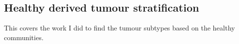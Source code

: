 \subsection{Healthy derived tumour stratification}

This covers the work I did to find the tumour subtypes based on the healthy communities.
